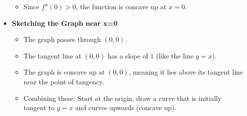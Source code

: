 \begin{cascade}[Qualitative Graph Sketching of Integral Functions near x=0]
\begin{itemize}
\begin{itemize}
			      \item Since $f''(0) > 0$, the function is concave up at $x=0$.
		      \end{itemize}
		\item \textbf{Sketching the Graph near x=0}
		      \begin{itemize}
			      \item The graph passes through $(0, 0)$.
			      \item The tangent line at $(0, 0)$ has a slope of $1$ (like the line $y=x$).
			      \item The graph is concave up at $(0, 0)$, meaning it lies above its tangent line near the point of tangency.
			      \item Combining these: Start at the origin, draw a curve that is initially tangent to $y=x$ and curves upwards (concave up).
		      \end{itemize}
	\end{itemize}
\end{cascade}

